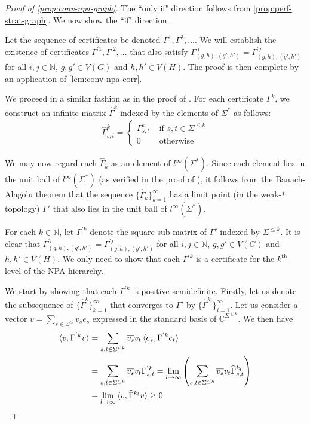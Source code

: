 \documentclass[11pt,a4paper]{article}
\theoremstyle{plain}
\theoremstyle{remark}
\theoremstyle{definition}
\begin{document}
\begin{proof}[Proof of \ref{prop:conv-npa-graph}]
    The ``only if" direction follows from \cref{prop:perf-strat-graph}. We now show the ``if" direction. 

    Let the sequence of certificates be denoted $\Gamma^1, \Gamma^2, \dots$. We will establish the existence of certificates $\Gamma^{'1}, \Gamma^{'2}, \dots$ that also satisfy $\Gamma^{'i}_{(g,h), (g',h')}=  \Gamma^{'j}_{(g,h), (g',h')}$ for all $i, j \in \mathbb{N}$, $g,g' \in V(G)$ and $h,h' \in V(H)$. The proof is then complete by an application of \cref{lem:conv-npa-corr}. 

    We proceed in a similar fashion as in the proof of \cite[Corollary 2]{russell_synchronous_2023}. For each certificate $\Gamma^k$, we construct an infinite matrix $\widehat{\Gamma}^k$ indexed by the elements of $\Sigma^*$ as follows: 
    \begin{align*}
        \widehat{\Gamma}^k_{s, t} = \begin{cases}
            \Gamma^k_{s,t} & \text{ if } s,t \in \Sigma^{\leq k} \\
            0 & \text{ otherwise }
        \end{cases}
    \end{align*}


    We may now regard each $\widehat{\Gamma}_k$ as an element of $l^{\infty}(\Sigma^*)$. Since each element lies in the unit ball of $l^{\infty}(\Sigma^*)$ (as verified in the proof of \cite[Corollary 2]{russell_synchronous_2023}), it follows from the Banach-Alagolu theorem that the sequence $\{\widehat{\Gamma}_k\}_{k = 1}^{\infty}$ has a limit point (in the weak-$*$ topology) $\Gamma'$ that also lies in the unit ball of $l^{\infty}(\Sigma^*)$. 

    For each $k \in \mathbb{N}$, let $\Gamma^{'k}$ denote the square sub-matrix of $\Gamma'$ indexed by $\Sigma^{\leq k}$. It is clear that $\Gamma^{'i}_{(g,h), (g',h')}=  \Gamma^{'j}_{(g,h), (g',h')}$ for all $i, j \in \mathbb{N}$, $g,g' \in V(G)$ and $h,h' \in V(H)$. We only need to show that each $\Gamma^{'k}$ is a certificate for the $k^{\text{th}}$-level of the NPA hierarchy. 

    We start by showing that each $\Gamma^{'k}$ is positive semidefinite. Firstly, let us denote the subsequence of $\{\widehat{\Gamma}^k\}_{k=1}^{\infty}$ that converges to $\Gamma'$ by $\{\widehat{\Gamma}^{k_i}\}_{i=1}^{\infty}$. Let us consider a vector $v = \sum_{s\in \Sigma^{\leq}} v_s e_s$ expressed in the standard basis of $\mathbb{C}^{\Sigma^{\leq k}}$. We then have 
    \begin{align*}
        \braket{v , \Gamma^{'k} v} & = \sum_{s, t \in \Sigma^{\leq k}} \overline{v_{s}}v_t \braket{e_s, \Gamma^{'k} e_t} \\
        & = \sum_{s, t \in \Sigma^{\leq k}} \overline{v_{s}}v_t \Gamma^{'k}_{s,t} = \lim_{l \to \infty }\left(\sum_{s, t \in \Sigma^{\leq k}} \overline{v_{s}}v_t \widehat{\Gamma}^{k_l}_{s,t} \right) \\
        & = \lim_{l \to \infty } \braket{v , \widehat{\Gamma}^{k_l} v}  \geq 0 
    \end{align*}


\end{proof}
\end{document}
